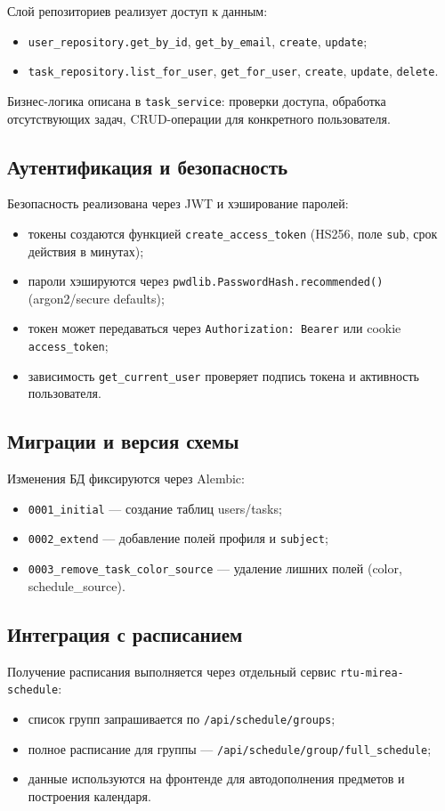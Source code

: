 Слой репозиториев реализует доступ к данным:
\begin{itemize}
    \item \texttt{user\_repository.get\_by\_id}, \texttt{get\_by\_email}, \texttt{create}, \texttt{update};
    \item \texttt{task\_repository.list\_for\_user}, \texttt{get\_for\_user}, \texttt{create}, \texttt{update}, \texttt{delete}.
\end{itemize}

Бизнес-логика описана в \texttt{task\_service}: проверки доступа, обработка отсутствующих задач, CRUD-операции для конкретного пользователя.

\subsection{Аутентификация и безопасность}

Безопасность реализована через JWT и хэширование паролей:
\begin{itemize}
    \item токены создаются функцией \texttt{create\_access\_token} (HS256, поле \texttt{sub}, срок действия в минутах);
    \item пароли хэшируются через \texttt{pwdlib.PasswordHash.recommended()} (argon2/secure defaults);
    \item токен может передаваться через \texttt{Authorization: Bearer} или cookie \texttt{access\_token};
    \item зависимость \texttt{get\_current\_user} проверяет подпись токена и активность пользователя.
\end{itemize}

\subsection{Миграции и версия схемы}

Изменения БД фиксируются через Alembic:
\begin{itemize}
    \item \texttt{0001\_initial} --- создание таблиц users/tasks;
    \item \texttt{0002\_extend} --- добавление полей профиля и \texttt{subject};
    \item \texttt{0003\_remove\_task\_color\_source} --- удаление лишних полей (color, schedule\_source).
\end{itemize}

\subsection{Интеграция с расписанием}

Получение расписания выполняется через отдельный сервис \texttt{rtu-mirea-schedule}:
\begin{itemize}
    \item список групп запрашивается по \texttt{/api/schedule/groups};
    \item полное расписание для группы --- \texttt{/api/schedule/{group}/full\_schedule};
    \item данные используются на фронтенде для автодополнения предметов и построения календаря.
\end{itemize}
